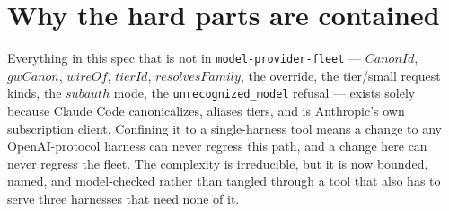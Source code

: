 \documentclass{article}
\begin{document}
\section{Why the hard parts are contained}

Everything in this spec that is not in \texttt{model-provider-fleet} ---
$CanonId$, $gwCanon$, $wireOf$, $tierId$, $resolvesFamily$, the override, the
tier/small request kinds, the $subauth$ mode, the \texttt{unrecognized\_model}
refusal --- exists solely because Claude Code canonicalizes, aliases tiers, and
is Anthropic's own subscription client. Confining it to a single-harness tool
means a change to any OpenAI-protocol harness can never regress this path, and a
change here can never regress the fleet. The complexity is irreducible, but it is
now bounded, named, and model-checked rather than tangled through a tool that
also has to serve three harnesses that need none of it.
\end{document}
